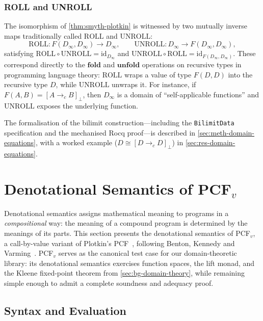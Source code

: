 \subsubsection*{ROLL and UNROLL}

The isomorphism of \cref{thm:smyth-plotkin} is witnessed by two
mutually inverse maps traditionally called $\mathrm{ROLL}$ and
$\mathrm{UNROLL}$:
\[
  \mathrm{ROLL} : F(D_\infty, D_\infty) \to D_\infty,
  \qquad
  \mathrm{UNROLL} : D_\infty \to F(D_\infty, D_\infty),
\]
satisfying $\mathrm{ROLL} \circ \mathrm{UNROLL} = \mathrm{id}_{D_\infty}$
and $\mathrm{UNROLL} \circ \mathrm{ROLL} = \mathrm{id}_{F(D_\infty,
D_\infty)}$.
These correspond directly to the $\mathbf{fold}$ and $\mathbf{unfold}$
operations on recursive types in programming language theory:
$\mathrm{ROLL}$ wraps a value of type $F(D, D)$ into the recursive type
$D$, while $\mathrm{UNROLL}$ unwraps it.  For instance, if
$F(A, B) = [A \to_c B]_\bot$, then $D_\infty$ is a domain of
``self-applicable functions'' and $\mathrm{UNROLL}$ exposes the
underlying function.

The formalisation of the bilimit construction---including the
\texttt{BilimitData} specification and the mechanised Rocq
proof---is described in \cref{sec:meth-domain-equations}, with a
worked example ($D \cong [D \to_c D]_\bot$) in
\cref{sec:res-domain-equations}.

\section{Denotational Semantics of PCF\texorpdfstring{$_v$}{v}}
\label{sec:bg-denotational}

Denotational semantics assigns mathematical meaning to programs in a
\emph{compositional} way: the meaning of a compound program is determined
by the meanings of its parts.  This section presents the denotational
semantics of PCF$_v$, a call-by-value variant of Plotkin's
PCF~\cite{Plotkin1977}, following Benton, Kennedy and
Varming~\cite{BKV2009}.  PCF$_v$ serves as the canonical test case for our
domain-theoretic library: its denotational semantics exercises function
spaces, the lift monad, and the Kleene fixed-point theorem from
\cref{sec:bg-domain-theory}, while remaining simple enough to admit a
complete soundness and adequacy proof.

\subsection{Syntax and Evaluation}
\label{sec:bg-pcf-syntax}

